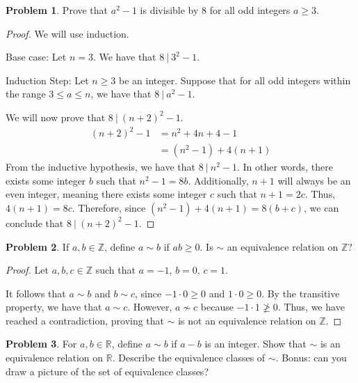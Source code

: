 \documentclass[12pt,reqno]{article}
\newcommand{\Z}{\mathbb{Z}}
\theoremstyle{definition}
\newtheorem{problem}{Problem}
\begin{document}
\newpage


\begin{problem} 
Prove that $a^2-1$ is divisible by 8 for all odd integers $a\geq 3$.
\end{problem}

\begin{proof}
We will use induction.

Base case: Let $n = 3$. We have that $8\ |\ 3^2 - 1$.

Induction Step: Let $n \geq 3$ be an integer. Suppose that for all odd integers within the range $3 \leq a \leq n$, we have that $8\ |\ a^2 - 1$.

We will now prove that $8\ |\ (n + 2)^2 - 1$.
\begin{align*}
    (n + 2)^2 - 1 &= n^2 + 4n + 4 - 1\\
    &= (n^2 - 1) + 4(n + 1)
\end{align*}
From the inductive hypothesis, we have that $8\ |\ n^2 - 1$. In other words, there exists some integer $b$ such that $n^2 - 1 = 8b$. Additionally, $n + 1$ will always be an even integer, meaning there exists some integer $c$ such that $n+1 = 2c$. Thus, $4(n+1) = 8c$. Therefore, since $(n^2 - 1) + 4(n + 1) = 8(b + c)$, we can conclude that $8\ |\ (n+2)^2 - 1$.
\end{proof}

\newpage


\begin{problem} 
If $a,b \in \mathbb{Z}$, define $a \sim b$ if $ab \geq 0$. Is $\sim$ an equivalence relation on $\mathbb{Z}$?
\end{problem}

\begin{proof}
    Let $a,b,c\in\Z$ such that $a = -1$, $b=0$, $c=1$.

    It follows that $a \sim b$ and $b\sim c$, since $-1 \cdot 0 \geq 0$ and $1\cdot 0 \geq 0$. By the transitive property, we have that $a\sim c$. However, $a\nsim c$ because $-1\cdot 1 \ngeq 0$. Thus, we have reached a contradiction, proving that $\sim$ is not an equivalence relation on $\Z$. 
\end{proof}

\newpage


\begin{problem} 
For $a,b \in \mathbb{R}$, define $a \sim b$ if $a - b$ is an integer. Show that $\sim$ is an equivalence relation on $\mathbb{R}$. Describe the equivalence classes of $\sim$. Bonus: can you draw a picture of the set of equivalence classes?
\end{problem}
\end{document}
